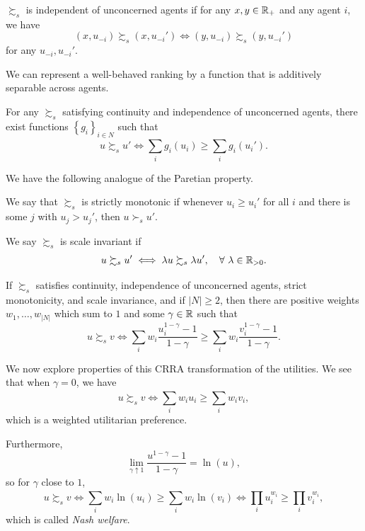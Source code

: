 \begin{definition}
	$\succsim_s$ is independent of unconcerned agents if for any $x,y \in \mathbb{R}_+$ and any agent $i$, we have \[
		(x, u_{-i}) \succsim_s (x, u_{-i}') \iff (y,u_{-i}) \succsim_s (y,u_{-i}')
	\] 
	for any $u_{-i}, u_{-i}'$.
\end{definition}

We can represent a well-behaved ranking by a function that is additively separable across agents.

\begin{theorem}[Debreu]
	For any $\succsim_s$ satisfying continuity and independence of unconcerned agents, there exist functions $\left\{g_i\right\}_{i \in N}$ such that \[
		u\succsim_s u' \iff \sum\limits_{i}^{} g_i(u_i) \ge \sum\limits_{i}^{} g_i(u_i')
	.\] 
\end{theorem}

We have the following analogue of the Paretian property.

\begin{definition}
	We say that $\succsim_s$ is strictly monotonic if whenever $u_i \ge u_i'$ for all $i$ and there is some $j$ with $u_j > u_j'$, then $u \succ_s u'$.
\end{definition}

\begin{definition}
	We say $\succsim_s$ is scale invariant if \[
		u \succsim_s u' \iff \lambda u \succsim_s \lambda u', \quad \forall\  \lambda \in \mathbb{R}_{>0}
	.\] 
\end{definition}

\begin{theorem} \label{4-1-1}
	If $\succsim_s$ satisfies continuity, independence of unconcerned agents, strict monotonicity, and scale invariance, and if $\left| N \right| \ge 2$, then there are positive weights $w_{1},\ldots,w_{\left| N \right|}$ which sum to $1$ and some $\gamma \in \mathbb{R}$ such that \[
		u \succsim_s v \iff \sum\limits_{i}^{} w_i \frac{u_i^{1-\gamma}-1}{1-\gamma} \ge \sum\limits_{i}^{} w_i \frac{v_i^{1-\gamma} - 1}{1- \gamma}
	.\] 
\end{theorem}

We now explore properties of this CRRA transformation of the utilities. We see that when $\gamma=0$, we have \[
	u \succsim_s v \iff \sum\limits_{i}^{} w_i u_i \ge \sum\limits_{i}^{} w_i v_i
,\] which is a weighted utilitarian preference.

Furthermore, \[
	\lim\limits_{\gamma \uparrow 1} \frac{u^{1-\gamma}-1}{1-\gamma} = \ln{\left(u\right)}
,\] so for $\gamma$ close to $1$,  \[
	u\succsim_s v  \iff \sum\limits_{i}^{} w_i \ln{\left(u_i\right)} \ge \sum\limits_{i}^{} w_i \ln{\left(v_i\right)} \iff \prod\limits_{i}^{} u_i^{w_i} \ge \prod\limits_{i}^{}  v_i ^{w_i}
,\] 
which is called \emph{Nash welfare}.

